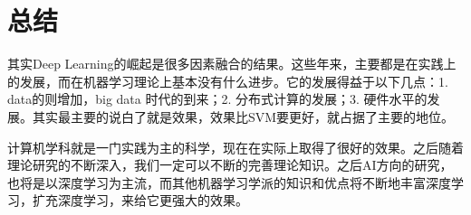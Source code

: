 \documentclass[a4paper]{article}
\begin{document}
\section{总结}
其实Deep Learning的崛起是很多因素融合的结果。这些年来，主要都是在实践上的发展，而在机器学习理论上基本没有什么进步。它的发展得益于以下几点：1. data的则增加，big data 时代的到来；2. 分布式计算的发展；3. 硬件水平的发展。其实最主要的说白了就是效果，效果比SVM要更好，就占据了主要的地位。

计算机学科就是一门实践为主的科学，现在在实际上取得了很好的效果。之后随着理论研究的不断深入，我们一定可以不断的完善理论知识。之后AI方向的研究，也将是以深度学习为主流，而其他机器学习学派的知识和优点将不断地丰富深度学习，扩充深度学习，来给它更强大的效果。
\end{document}
